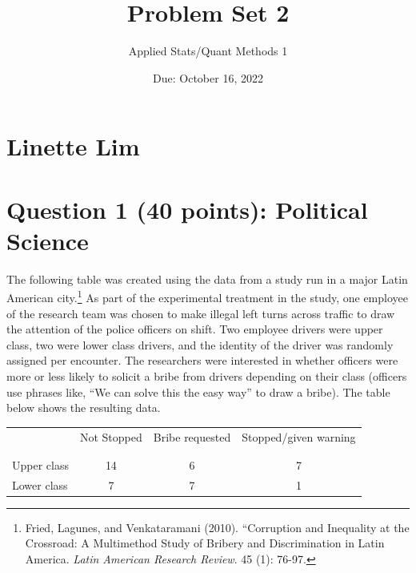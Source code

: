 \documentclass[12pt,letterpaper]{article}
\title{Problem Set 2}
\date{Due: October 16, 2022}
\author{Applied Stats/Quant Methods 1}
\begin{document}
	\maketitle
	\section*{Linette Lim}	
	\vspace{.5cm}
	\section*{Question 1 (40 points): Political Science}
		\vspace{.25cm}
	The following table was created using the data from a study run in a major Latin American city.\footnote{Fried, Lagunes, and Venkataramani (2010). ``Corruption and Inequality at the Crossroad: A Multimethod Study of Bribery and Discrimination in Latin America. \textit{Latin American Research Review}. 45 (1): 76-97.} As part of the experimental treatment in the study, one employee of the research team was chosen to make illegal left turns across traffic to draw the attention of the police officers on shift. Two employee drivers were upper class, two were lower class drivers, and the identity of the driver was randomly assigned per encounter. The researchers were interested in whether officers were more or less likely to solicit a bribe from drivers depending on their class (officers use phrases like, ``We can solve this the easy way'' to draw a bribe). The table below shows the resulting data.

\newpage
\begin{table}[h!]
	\centering
	\begin{tabular}{l | c c c }
		& Not Stopped & Bribe requested & Stopped/given warning \\
		\\[-1.8ex] 
		\hline \\[-1.8ex]
		Upper class & 14 & 6 & 7 \\
		Lower class & 7 & 7 & 1 \\
		\hline
	\end{tabular}
\end{table}
\end{document}
